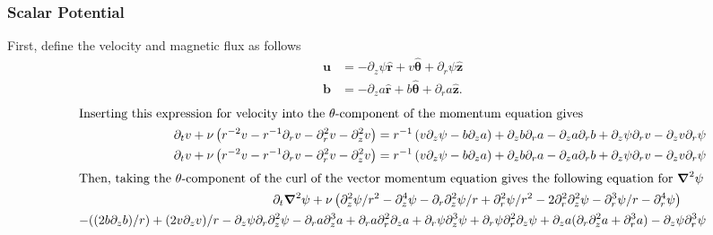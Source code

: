 \documentclass[10pt]{article}
\renewcommand{\vec}[1]{\boldsymbol{#1}}
\newcommand{\grad}{\vec{\nabla}}
\begin{document}
\subsubsection{Scalar Potential}
First, define the velocity and magnetic flux as follows
\begin{align*}
  \vec{u} &= -\partial_z\psi\vec{\hat{r}} + v\vec{\hat{\theta}} + \partial_r\psi\vec{\hat{z}} \\
  \vec{b} &= -\partial_z a\vec{\hat{r}} + b\vec{\hat{\theta}} + \partial_r a\vec{\hat{z}}.
\end{align*}
\begin{align*}
\intertext{Inserting this expression for velocity into the $\theta$-component of the momentum equation gives}
  \partial_t v + \nu\left( r^{-2}v - r^{-1}\partial_rv  - \partial_r^2v - \partial_z^2v \right) = r^{-1}\left( v\partial_z\psi - b\partial_za \right) + \partial_zb\partial_ra - \partial_za\partial_rb + \partial_z\psi\partial_rv - \partial_zv\partial_r\psi \\
  \partial_t v + \nu\left( r^{-2}v - r^{-1}\partial_rv  - \partial_r^2v - \partial_z^2v \right) = r^{-1}\left( v\partial_z\psi - b\partial_za \right) + \partial_zb\partial_ra - \partial_za\partial_rb + \partial_z\psi\partial_rv - \partial_zv\partial_r\psi \\
  \intertext{Then, taking the $\theta$-component of the curl of the vector momentum equation gives the following equation for $\grad^2\psi$}
  \partial_t\grad^2\psi + \nu \left(\partial_z^2\psi/r^2-\partial_z^4\psi-\partial_r\partial_z^2\psi/r+\partial_r^2\psi/r^2-2 \partial_r^2\partial_z^2\psi - \partial_r^3\psi/r-\partial_r^4\psi \right)\quad\quad \\
  -((2 b \partial_zb)/r)+(2 v \partial_z v)/r-\partial_z\psi \partial_r\partial_z^2\psi - \partial_ra \partial_z^3a+ \partial_ra \partial_r^2\partial_za + \partial_r\psi \partial_z^3\psi + \partial_r\psi \partial_r^2\partial_z\psi + \partial_z a (\partial_r\partial_z^2a+\partial_r^3a)-\partial_z\psi \partial_r^3\psi \\ 
\end{align*}
\end{document}
